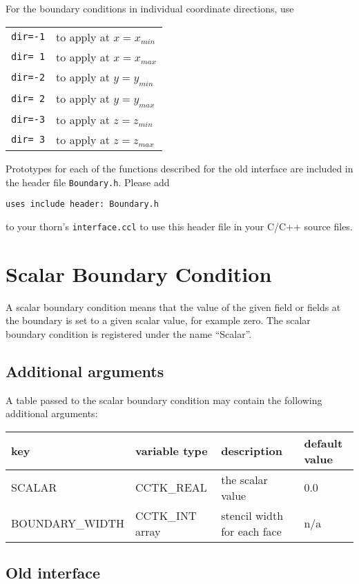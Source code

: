 \documentclass{article}
\begin{document}
For the boundary conditions in individual coordinate directions, use\\
\begin{tabular}{ll}
{\tt dir=-1} & to apply at $x=x_{min}$ \\
{\tt dir= 1} & to apply at $x=x_{max}$ \\
{\tt dir=-2} & to apply at $y=y_{min}$ \\
{\tt dir= 2} & to apply at $y=y_{max}$ \\
{\tt dir=-3} & to apply at $z=z_{min}$ \\
{\tt dir= 3} & to apply at $z=z_{max}$ \\
\end{tabular} 

Prototypes for each of the functions described for the old interface
are included in the header file \texttt{Boundary.h}.  Please add
\begin{verbatim}
uses include header: Boundary.h
\end{verbatim}
to your thorn's \texttt{interface.ccl} to use this header file in your C/C++
source files.

\section{Scalar Boundary Condition}

A scalar boundary condition means that the value of the given 
field or fields at the boundary is set to a given scalar value, for 
example zero.  The scalar boundary condition is registered under the name ``Scalar''.

\subsection{Additional arguments}

A table passed to the scalar boundary condition may contain the
following additional arguments:\\[1mm]
\begin{tabular}{|l|l|l|l|}
\hline
\textbf{key} & \textbf{variable type} & \textbf{description} & \textbf{default value}\\
\hline
SCALAR & CCTK\_REAL & the scalar value & 0.0\\
BOUNDARY\_WIDTH & CCTK\_INT array & stencil width for each face & n/a\\
\hline
\end{tabular}

\subsection{Old interface}
\end{document}
